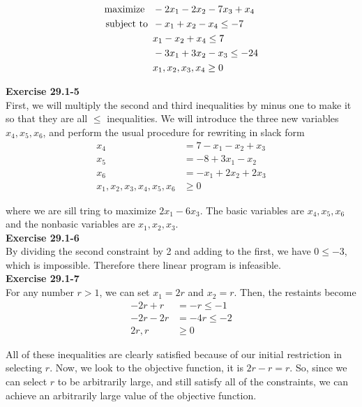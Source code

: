 \documentclass{article}
\begin{document}
\begin{align*}
\mbox{maximize \,\,\,} & -2x_1 - 2x_2 - 7x_3 + x_4 \\
\mbox{subject to \,} & -x_1 + x_2 - x_4 \leq -7 \\
& x_1 - x_2 + x_4 \leq 7 \\
& -3x_1 + 3x_2 - x_3 \leq -24 \\
& x_1,x_2,x_3,x_4 \geq 0
\end{align*}


\noindent\textbf{Exercise 29.1-5}\\

First, we will multiply the second and third inequalities by minus one to make it so that they are all $\le$ inequalities. We will introduce the three new variables $x_4,x_5,x_6$, and perform the usual procedure for rewriting in slack form
\begin{align*}
x_4 &= 7-x_1 - x_2 +x_3\\
x_5 &= -8 +3x_1 - x_2\\
x_6 &= -x_1+2x_2 +2x_3\\
x_1,x_2,x_3,x_4,x_5,x_6 &\ge 0
\end{align*}

where we are sill tring to maximize $2x_1 -6x_3$. The basic variables are $x_4,x_5,x_6$ and the nonbasic variables are $x_1,x_2,x_3$.\\

\noindent\textbf{Exercise 29.1-6}\\

By dividing the second constraint by 2 and adding to the first, we have $0 \leq -3$, which is impossible.  Therefore there linear program is infeasible. \\

\noindent\textbf{Exercise 29.1-7}\\

For any number $r>1$, we can set $x_1 = 2r$ and $x_2 = r$. Then, the restaints become
\begin{align*}
-2r +r &= -r \le -1\\
-2r -2r &=-4r \le -2\\
2r,r &\ge 0
\end{align*}

All of these inequalities are clearly satisfied because of our initial restriction in selecting $r$. Now, we look to the objective function, it is $2r -r = r$. So, since we can select $r$ to be arbitrarily large, and still satisfy all of the constraints, we can achieve an arbitrarily large value of the objective function.\\
\end{document}
